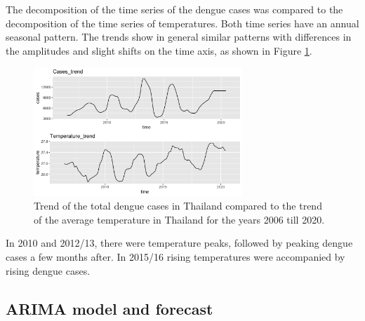 	The decomposition of the time series of the dengue cases was compared to the decomposition of the time series of temperatures. Both time series have an annual seasonal pattern. The trends show in general similar patterns with differences in the amplitudes and slight shifts on the time axis, as shown in Figure \ref{fig:Trend_temp_cases}.
	\begin{figure}[hbpt] 
		\centering
		\includegraphics[width=0.7\textwidth]{fig/Trend_temp_cases.png}
		\caption{Trend of the total dengue cases in Thailand compared to the trend of the average temperature in Thailand for the years 2006 till 2020.}
		\label{fig:Trend_temp_cases}
	\end{figure}
	 In 2010 and 2012/13, there were temperature peaks, followed by peaking dengue cases a few months after. In 2015/16 rising temperatures were accompanied by rising dengue cases. 

	\subsection{ARIMA model and forecast}
	
